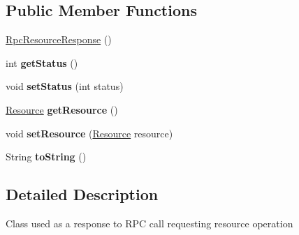 \subsection*{Public Member Functions}
\begin{DoxyCompactItemize}
\item 
\hyperlink{classeu_1_1h2020_1_1symbiote_1_1model_1_1RpcResourceResponse_aa3fb7986c653ddbe97463011290fe2a7}{Rpc\+Resource\+Response} ()
\item 
int {\bfseries get\+Status} ()\hypertarget{classeu_1_1h2020_1_1symbiote_1_1model_1_1RpcResourceResponse_a64655e4dbe4ba990cc6db5c963c5f2b7}{}\label{classeu_1_1h2020_1_1symbiote_1_1model_1_1RpcResourceResponse_a64655e4dbe4ba990cc6db5c963c5f2b7}

\item 
void {\bfseries set\+Status} (int status)\hypertarget{classeu_1_1h2020_1_1symbiote_1_1model_1_1RpcResourceResponse_aa02fb9113fa7af9d2b2bd980d08a7571}{}\label{classeu_1_1h2020_1_1symbiote_1_1model_1_1RpcResourceResponse_aa02fb9113fa7af9d2b2bd980d08a7571}

\item 
\hyperlink{classeu_1_1h2020_1_1symbiote_1_1model_1_1Resource}{Resource} {\bfseries get\+Resource} ()\hypertarget{classeu_1_1h2020_1_1symbiote_1_1model_1_1RpcResourceResponse_adfbf0e5849dc241586d264bef8aa19f6}{}\label{classeu_1_1h2020_1_1symbiote_1_1model_1_1RpcResourceResponse_adfbf0e5849dc241586d264bef8aa19f6}

\item 
void {\bfseries set\+Resource} (\hyperlink{classeu_1_1h2020_1_1symbiote_1_1model_1_1Resource}{Resource} resource)\hypertarget{classeu_1_1h2020_1_1symbiote_1_1model_1_1RpcResourceResponse_a4700ed3c58d3cac28ba62da378ae002e}{}\label{classeu_1_1h2020_1_1symbiote_1_1model_1_1RpcResourceResponse_a4700ed3c58d3cac28ba62da378ae002e}

\item 
String {\bfseries to\+String} ()\hypertarget{classeu_1_1h2020_1_1symbiote_1_1model_1_1RpcResourceResponse_a5caff9d21a27972951f087f17ad24da7}{}\label{classeu_1_1h2020_1_1symbiote_1_1model_1_1RpcResourceResponse_a5caff9d21a27972951f087f17ad24da7}

\end{DoxyCompactItemize}


\subsection{Detailed Description}
Class used as a response to R\+PC call requesting resource operation 

